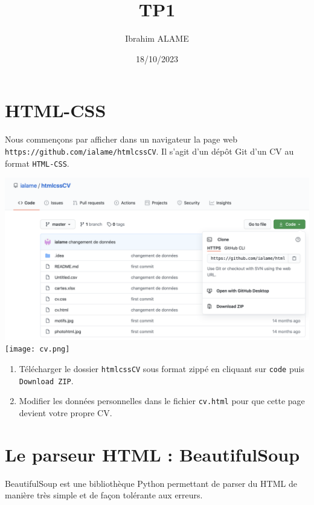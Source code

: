 \documentclass[a4paper]{article}
\title{TP1}
\author{Ibrahim ALAME}
\date{18/10/2023}
\begin{document}
\maketitle
\section{HTML-CSS}%
Nous commençons par afficher dans un navigateur la page web  {\tt https://github.com/ialame/htmlcssCV}. Il s'agit d'un dépôt Git d'un CV au format {\tt HTML-CSS}.

\begin{center}
\includegraphics[scale=0.3]{git.png} 
\texttt{[image: cv.png]} 
\end{center}


\begin{enumerate}
\item Télécharger le dossier {\tt htmlcssCV} sous format zippé en cliquant sur {\tt code} puis {\tt Download ZIP}.
\item Modifier les données personnelles dans le fichier {\tt cv.html}  pour que cette page devient votre propre CV.
\end{enumerate}

\section{Le parseur HTML : BeautifulSoup}
BeautifulSoup est une bibliothèque Python permettant de parser du HTML de manière très simple et de façon tolérante aux erreurs. 
\end{document}
